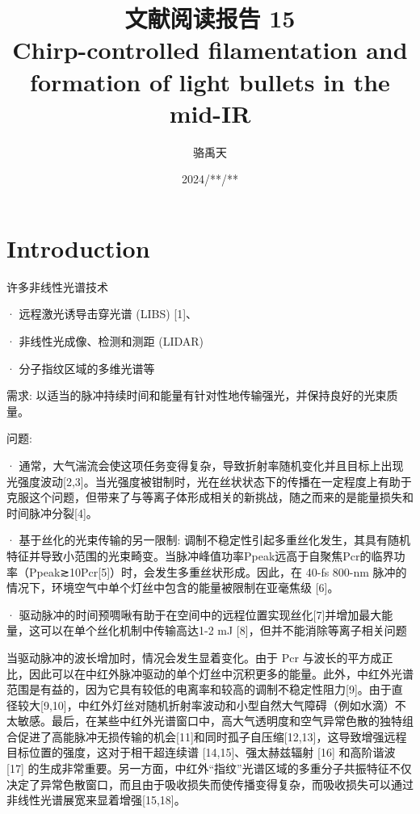 \documentclass[14pt,a4paper,oneside]{article}
\title{\textbf{文献阅读报告 15\\Chirp-controlled filamentation and formation of light bullets in the mid-IR}\cite{shumakovaChirpcontrolledFilamentationFormation2019}}                           %
\author{骆禹天}                                           %
\date{2024/**/**}                                        %
\begin{document}

\maketitle

\setcounter{page}{1}          %


\tableofcontents              %

\newpage
\setcounter{page}{1}          %








\section{Introduction}

许多非线性光谱技术

· 远程激光诱导击穿光谱 (LIBS) [1]、

· 非线性光成像、检测和测距 (LIDAR)

· 分子指纹区域的多维光谱等

需求: 以适当的脉冲持续时间和能量有针对性地传输强光，并保持良好的光束质量。

问题: 

· 通常，大气湍流会使这项任务变得复杂，导致折射率随机变化并且目标上出现光强度波动[2,3]。当光强度被钳制时，光在丝状状态下的传播在一定程度上有助于克服这个问题，但带来了与等离子体形成相关的新挑战，随之而来的是能量损失和时间脉冲分裂[4]。

· 基于丝化的光束传输的另一限制: 调制不稳定性引起多重丝化发生，其具有随机特征并导致小范围的光束畸变。当脉冲峰值功率Ppeak远高于自聚焦Pcr的临界功率（Ppeak≳10Pcr[5]）时，会发生多重丝状形成。因此，在 40-fs 800-nm 脉冲的情况下，环境空气中单个灯丝中包含的能量被限制在亚毫焦级 [6]。

· 驱动脉冲的时间预啁啾有助于在空间中的远程位置实现丝化[7]并增加最大能量，这可以在单个丝化机制中传输高达1-2 mJ [8]，但并不能消除等离子相关问题

当驱动脉冲的波长增加时，情况会发生显着变化。由于 Pcr 与波长的平方成正比，因此可以在中红外脉冲驱动的单个灯丝中沉积更多的能量。此外，中红外光谱范围是有益的，因为它具有较低的电离率和较高的调制不稳定性阻力[9]。由于直径较大[9,10]，中红外灯丝对随机折射率波动和小型自然大气障碍（例如水滴）不太敏感。最后，在某些中红外光谱窗口中，高大气透明度和空气异常色散的独特组合促进了高能脉冲无损传输的机会[11]和同时孤子自压缩[12,13]，这导致增强远程目标位置的强度，这对于相干超连续谱 [14,15]、强太赫兹辐射 [16] 和高阶谐波 [17] 的生成非常重要。另一方面，中红外“指纹”光谱区域的多重分子共振特征不仅决定了异常色散窗口，而且由于吸收损失而使传播变得复杂，而吸收损失可以通过非线性光谱展宽来显着增强[15,18]。
\end{document}
